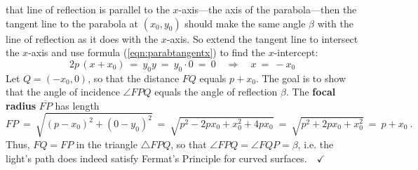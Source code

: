 that line of reflection is parallel to the $x$-axis---the axis of the
parabola---then the tangent line to the parabola at $(x_0,y_0)$ should make the
same angle $\beta$ with the line of reflection as it does with the $x$-axis. So
extend the tangent line to intersect the $x$-axis and use formula
(\ref{eqn:parabtangentx}) to find the $x$-intercept:
\[
2p\,(x+x_0) ~=~ y_0y ~=~ y_0 \cdot 0 ~=~ 0 \quad\Rightarrow\quad x ~=~ -x_0
\]
Let $Q=(-x_0,0)$, so that the distance $FQ$ equals $p+x_0$. The goal is to show
that the angle of incidence $\angle FPQ$ equals the angle of reflection $\beta$.
The \textbf{focal radius} $\overline{FP}$ has
length
\[
FP ~=~ \sqrt{(p-x_0)^2 + (0-y_0)^2} ~=~ \sqrt{p^2 - 2px_0 + x_0^2 + 4px_0} ~=~
\sqrt{p^2 + 2px_0 + x_0^2} ~=~ p+x_0 ~.
\]
Thus, $FQ=FP$ in the triangle $\triangle FPQ$, so that
$\angle FPQ = \angle FQP = \beta$, i.e. the light's path
does indeed satisfy Fermat's Principle for curved surfaces.$\quad\checkmark$

